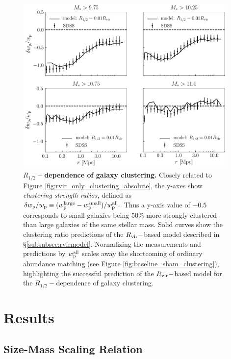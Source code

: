 \documentclass[usenatbib,usegraphicx,letterpaper]{mn2e}
\newcommand{\rhalf}{R_{1/2}}
\newcommand{\rvir}{R_{\rm vir}}
\newcommand{\wproj}{w_{\rm p}}
\begin{document}
\begin{figure}
\centering
\includegraphics[width=11cm]{FIGS/rvir_only_wp_ratios.pdf}
\caption{
{\bf $\rhalf-$dependence of galaxy clustering.}
Closely related to Figure \ref{fig:rvir_only_clustering_absolute}, the y-axes show {\em clustering strength ratios,} defined as $\delta\wproj/\wproj\equiv(w_{\rm p}^{\rm large} - w_{\rm p}^{\rm small})/w_{\rm p}^{\rm all}.$ Thus a y-axis value of $-0.5$ corresponds to small galaxies being $50\%$ more strongly clustered than large galaxies of the same stellar mass. Solid curves show the clustering ratio predictions of the $\rvir-$based model described in \S\ref{subsubsec:rvirmodel}. Normalizing the measurements and predictions by $w_{\rm p}^{\rm all}$ scales away the shortcoming of ordinary abundance matching (see Figure \ref{fig:baseline_sham_clustering}), highlighting the successful prediction of the $\rvir-$based model for the $\rhalf-$dependence of galaxy clustering.
}
\label{fig:clustering_ratio_upshot}
\end{figure}

\section{Results}
\label{sec:results}

\subsection{Size-Mass Scaling Relation}
\label{subsec:one_point_function}
\end{document}
